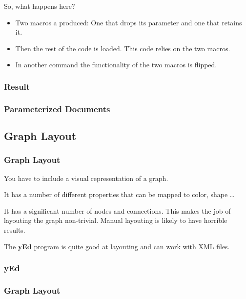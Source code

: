 {\begin{frame}[fragile]
  \pause
  \vspace{5mm}
  So, what happens here?
  \pause
  \begin{itemize}
    \item Two macros a produced: One that drops its parameter and one that retains it.
    \item Then the rest of the code is loaded. This code relies on the two macros.
    \item In another command the functionality of the two macros is flipped.
  \end{itemize}
\end{frame}

\subsubsection{Result}
\begin{frame}[fragile]
  \frametitle{Parameterized Documents }
  \vspace{3mm}
  
\end{frame}

\subsection{Graph Layout}
\begin{frame}[fragile]
  \frametitle{Graph Layout}
  \vspace{3mm}
  You have to include a visual representation of a graph.
  
  \vspace{5mm}
  It has a number of different properties that can be mapped to color, shape \ldots
  
  \vspace{5mm}
  It has a significant number of nodes and connections. This makes the job of layouting the graph non-trivial. Manual layouting is likely to have horrible results.
  
  \vspace{5mm}
  The \textbf{yEd} program is quite good at layouting and can work with XML files.
\end{frame}

\subsubsection{yEd}
\begin{frame}[fragile]
  \frametitle{Graph Layout }
  

\end{frame}}

